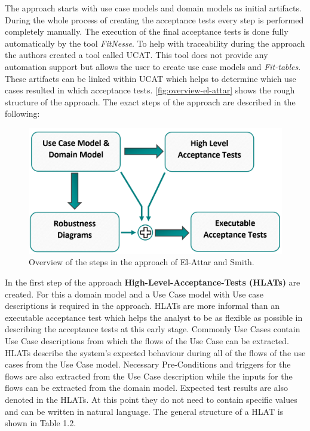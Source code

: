 The approach starts with use case models and domain models as initial artifacts.
During the whole process of creating the acceptance tests every step is performed completely manually.
The execution of the final acceptance tests is done fully automatically by the tool \textit{FitNesse}.
To help with traceability during the approach the authors created a tool called UCAT.
This tool does not provide any automation support but allows the user to create use case models and \textit{Fit-tables}.
These artifacts can be linked within UCAT which helps to determine which use cases resulted in which acceptance tests.
 \autoref{fig:overview-el-attar} shows the rough structure of the approach.
The exact steps of the approach are described in the following:

\begin{figure}
	\centering
	\includegraphics[width=.7\textwidth]{../images/ElAttarProcess.png}
	\caption{Overview of the steps in the approach of El-Attar and Smith.}
	\label{fig:overview-el-attar}
\end{figure}

In the first step of the approach \textbf{High-Level-Acceptance-Tests (HLATs)} are created.
For this a domain model and a Use Case model with Use case descriptions is required in the approach.
HLATs are more informal than an executable acceptance test which helps the analyst to be as flexible as possible in describing the acceptance tests at this early stage.
Commonly Use Cases contain Use Case descriptions from which the flows of the Use Case can be extracted.
HLATs describe the system's expected behaviour during all of the flows of the use cases from the Use Case model.
Necessary Pre-Conditions and triggers for the flows are also extracted from the Use Case description while the inputs for the flows can be extracted from the domain model.
Expected test results are also denoted in the HLATs.
At this point they do not need to contain specific values and can be written in natural language.
The general structure of a HLAT is shown in Table 1.2.


